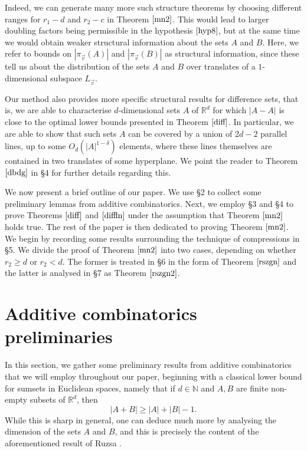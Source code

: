 Indeed, we can generate many more such structure theorems by choosing different ranges for $r_1 - d$ and $r_2 - c$ in Theorem $\ref{mn2}$. This would lead to larger doubling factors being permissible in the hypothesis $\eqref{hyp8}$, but at the same time we would obtain weaker structural information about the sets $A$ and $B$. Here, we refer to bounds on $|\pi_{\vec{v}}(A)|$ and $|\pi_{\vec{v}}(B)|$ as structural information, since these tell us about the distribution of the sets $A$ and $B$ over translates of a $1$-dimensional subspace $L_{\vec{v}}$. 
\par

Our method also provides more specific structural results for difference sets, that is, we are able to characterise $d$-dimensional sets $A$ of $\mathbb{R}^d$ for which $|A-A|$ is close to the optimal lower bounds presented in Theorem $\ref{diff}$. In particular, we are able to show that such sets $A$ can be covered by a union of $2d-2$ parallel lines, up to some $O_{d}(|A|^{1- \delta})$ elements, where these lines themselves are contained in two translates of some hyperplane. We point the reader to Theorem $\ref{dbdg}$ in \S4 for further details regarding this.
\par

We now present a brief outline of our paper. We use \S2 to collect some preliminary lemmas from additive combinatorics. Next, we employ \S3 and \S4 to prove Theorems $\ref{diff}$ and $\ref{diffln}$ under the assumption that Theorem $\ref{mn2}$ holds true. The rest of the paper is then dedicated to proving Theorem $\ref{mn2}$. We begin by recording some results surrounding the technique of compressions in \S5. We divide the proof of Theorem $\ref{mn2}$ into two cases, depending on whether $r_2 \geq d$ or $r_2 < d$. The former is treated in \S6 in the form of Theorem $\ref{rszgn}$ and the latter is analysed in \S7 as Theorem $\ref{rszgn2}$.




\section{Additive combinatorics preliminaries}

In this section, we gather some preliminary results from additive combinatorics that we will employ throughout our paper, beginning with a classical lower bound for sumsets in Euclidean spaces, namely that if $d \in \mathbb{N}$ and $A, B$ are finite non-empty subsets of $\mathbb{R}^d$, then
\begin{equation} \label{runit}
 |A+B| \geq |A| + |B| - 1. 
 \end{equation}
 While this is sharp in general, one can deduce much more by analysing the dimension of the sets $A$ and $B$, and this is precisely the content of the aforementioned result of Ruzsa \cite{Ru1994}.

